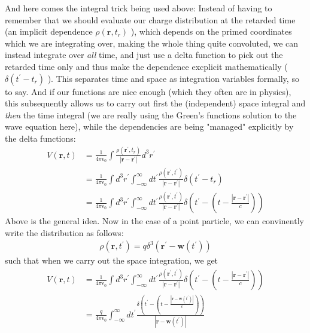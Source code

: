 And here comes the integral trick being used above: Instead of having to remember that we should evaluate our charge distribution at the retarded time (an implicit dependence \(\rho (\mathbf{r}, t_r)\) ), which depends on the primed coordinates which we are integrating over, making the whole thing quite convoluted, we can instead integrate over \textit{all} time, and just use a delta function to pick out the retarded time only and thus make the dependence excplicit mathematically (\(\delta (t^{\prime}  - t_r)\) ). This separates time and space as integration variables formally, so to say. And if our functions are nice enough (which they often are in physics), this subsequently allows us to carry out first the (independent) space integral and \textit{then} the time integral (we are really using the Green's functions solution to the wave equation here), while the dependencies are being "managed" explicitly by the delta functions: \begin{align*}
    V(\mathbf{r}, t) &= \frac{1}{4\pi\epsilon_0} \int \frac{\rho (\mathbf{r}^{\prime} , t_r)}{\left| \mathbf{r} - \mathbf{r}^{\prime} \right| } d^3 r^{\prime} \\
    &= \frac{1}{4\pi\epsilon_0} \int d^3r^{\prime}  \int_{-\infty}^{\infty} dt^{\prime} \frac{\rho (\mathbf{r}^{\prime} , t^{\prime} )}{\left| \mathbf{r} - \mathbf{r}^{\prime}  \right| } \delta (t^{\prime} - t_r)\\
    &= \frac{1}{4\pi\epsilon_0} \int d^3r^{\prime}  \int_{-\infty}^{\infty} dt^{\prime} \frac{\rho (\mathbf{r}^{\prime} , t^{\prime} )}{\left| \mathbf{r} - \mathbf{r}^{\prime}  \right| } \delta (t^{\prime} - \left(t - \frac{\left| \mathbf{r} - \mathbf{r}^{\prime}  \right|}{c}\right))
\end{align*} 
Above is the general idea. Now in the case of a point particle, we can convinently write the distribution as follows: \begin{align*}
    \rho (\mathbf{r}, t^{\prime} ) = q \delta ^3 (\mathbf{r}^{\prime} - \mathbf{w}(t^{\prime} ))
\end{align*}
such that when we carry out the space integration, we get \begin{align*}
    V(\mathbf{r}, t) &= \frac{1}{4\pi\epsilon_0} \int d^3r^{\prime}  \int_{-\infty}^{\infty} dt^{\prime} \frac{\rho (\mathbf{r}^{\prime} , t^{\prime} )}{\left| \mathbf{r} - \mathbf{r}^{\prime}  \right| } \delta (t^{\prime} - \left(t - \frac{\left| \mathbf{r} - \mathbf{r}^{\prime}  \right|}{c}\right))\\
    &= \frac{q}{4\pi\epsilon_0}\int_{-\infty}^{\infty} dt^{\prime} \frac{\delta (t^{\prime} - \left(t - \frac{\left| \mathbf{r} - \mathbf{w}(t^{\prime})\right|}{c}\right))}{\left| \mathbf{r} - \mathbf{w}(t^{\prime} )  \right| }
\end{align*}
